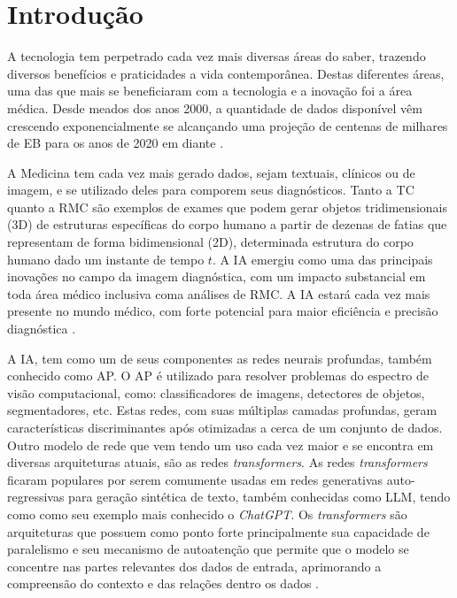\chapter{Introdução}
\label{chap:intro}

A tecnologia tem perpetrado cada vez mais diversas áreas do saber, trazendo diversos benefícios e praticidades a vida contemporânea. Destas diferentes áreas, uma das que mais se beneficiaram com a tecnologia e a inovação foi a área médica. Desde meados dos anos 2000, a quantidade de dados disponível vêm crescendo exponencialmente se alcançando uma projeção de centenas de milhares de \gls{EB} para os anos de 2020 em diante \cite{gantzDIGITALUNIVERSE2020}.

A Medicina tem cada vez mais gerado dados, sejam textuais, clínicos ou de imagem, e se utilizado deles para comporem seus diagnósticos. Tanto a \gls{TC} quanto a \gls{RMC} são exemplos de exames que podem gerar objetos tridimensionais (3D) de estruturas específicas do corpo humano a partir de dezenas de fatias que representam de forma bidimensional (2D), determinada estrutura do corpo humano dado um instante de tempo $t$. A \gls{IA} emergiu como uma das principais inovações no campo da imagem diagnóstica, com um impacto substancial em toda área médico inclusiva coma análises de \gls{RMC}. A \gls{IA} estará cada vez mais presente no mundo médico, com forte potencial para maior eficiência e precisão diagnóstica \cite{argentieroApplicationsArtificialIntelligence2022}.


A IA, tem como um de seus componentes as redes neurais profundas, também conhecido como \gls{AP}. O \gls{AP} é utilizado para resolver problemas do espectro de visão computacional, como: classificadores de imagens, detectores de objetos, segmentadores, etc. Estas redes, com suas múltiplas camadas profundas, geram características discriminantes após otimizadas a cerca de um conjunto de dados. Outro modelo de rede que vem tendo um uso cada vez maior e se encontra em diversas arquiteturas atuais, são as redes \textit{transformers}. As redes \textit{transformers} ficaram populares por serem comumente usadas em redes generativas auto-regressivas para geração sintética de texto, também conhecidas como \gls{LLM}, tendo como como seu exemplo mais conhecido o \textit{ChatGPT}. Os \textit{transformers} são arquiteturas que possuem como ponto forte principalmente sua capacidade de paralelismo e seu mecanismo de autoatenção que permite que o modelo se concentre nas partes relevantes dos dados de entrada, aprimorando a compreensão do contexto e das relações dentro os dados \cite{russell2020artificial}.

